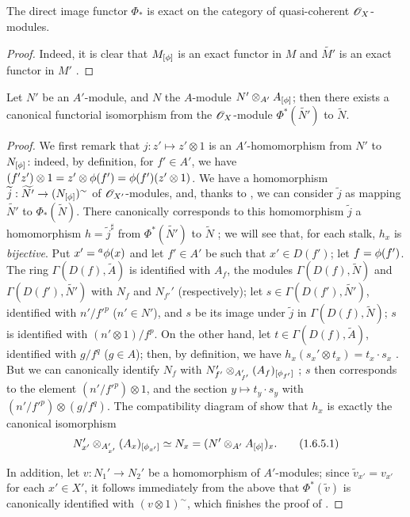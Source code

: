 \begin{corollary}[1.6.4]
\label{1.1.6.4}
The direct image functor $\Phi_*$ is exact on the category of quasi-coherent $\mathscr{O}_X$-modules.
\end{corollary}

\begin{proof}
\label{proof-1.1.6.4}
Indeed, it is clear that $M_{[\phi]}$ is an exact functor in $M$ and $\widetilde{M'}$ is an
exact functor in $M'$ .
\end{proof}

\begin{proposition}[1.6.5]
\label{1.1.6.5}
Let $N'$ be an $A'$-module, and $N$ the $A$-module $N'\otimes_{A'}A_{[\phi]}$;
then there exists a canonical functorial isomorphism from the $\mathscr{O}_X$-module $\Phi^*(\widetilde{N'})$ to $\widetilde{N}$.
\end{proposition}

\begin{proof}
\label{proof-1.1.6.5}
We first remark that $j:z'\mapsto z'\otimes 1$ is an $A'$-homomorphism from $N'$ to $N_{[\phi]}$: indeed, by definition, for $f'\in A'$, we have $(f' z')\otimes 1=z'\otimes\phi(f')=\phi(f')(z'\otimes 1)$.
We have  a homomorphism $\widetilde{j}:\widetilde{N'}\to(N_{[\vphi]})^\sim$ of $\mathscr{O}_{X'}$-modules, and, thanks to , we can consider $\widetilde{j}$ as mapping $\widetilde{N'}$ to $\Phi_*(\widetilde{N})$.
There canonically corresponds to this homomorphism $\widetilde{j}$ a homomorphism $h=\widetilde{j}^\sharp$ from $\Phi^*(\widetilde{N'})$ to $\widetilde{N}$ ;
we will see that, for each stalk, $h_x$ is \emph{bijective}.
Put $x'={}^a\phi(x)$ and let $f'\in A'$ be such that $x'\in D(f')$;
let $f=\phi(f')$.
The ring $\Gamma(D(f),\widetilde{A})$ is identified with $A_f$, the modules
$\Gamma(D(f),\widetilde{N})$ and $\Gamma(D(f'),\widetilde{N'})$ with $N_f$ and $N_{f'}'$
(respectively);
let $s\in\Gamma(D(f'),\widetilde{N'})$, identified with $n'/{f'}^p$ ($n'\in N'$), and $s$ be its image under $\widetilde{j}$ in $\Gamma(D(f),\widetilde{N})$;
$s$ is identified with $(n'\otimes 1)/f^p$.
On the other hand, let $t\in\Gamma(D(f),\widetilde{A})$, identified with $g/f^q$ ($g\in A$);
then, by definition, we have $h_x(s_x'\otimes t_x)=t_x\cdot s_x$ .
But we can canonically identify $N_f$ with $N_{f'}'\otimes_{A_{f'}'}(A_f)_{[\phi_{f'}]}$ ;
$s$ then corresponds to the element $(n'/{f'}^p)\otimes 1$, and the section $y\mapsto t_y\cdot s_y$ with $(n'/{f'}^p)\otimes(g/f^q)$.
The compatibility diagram of  show that $h_x$ is exactly the canonical isomorphism
\[
  \label{1.1.6.5.1}
  N_{x'}'\otimes_{A_{x'}'}(A_x)_{[\phi_{x'}]}\simeq N_x=(N'\otimes_{A'}A_{[\phi]})_x.
  \tag{1.6.5.1}
\]

In addition, let $v:N_1'\to N_2'$ be a homomorphism of $A'$-modules;
since $\widetilde{v}_{x'}=v_{x'}$ for each $x'\in X'$, it follows immediately from the above that $\Phi^*(\widetilde{v})$ is canonically identified with $(v\otimes 1)^\sim$, which finishes the proof of .
\end{proof}

